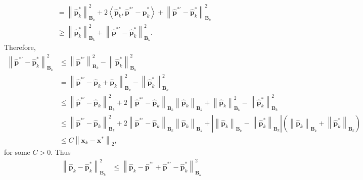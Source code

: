 \documentclass[aos]{imsart}
\numberwithin{equation}{section}
\theoremstyle{plain}
\begin{document}
\begin{appendix}
\begin{equation*}
\begin{split}
            & =  \left\|  \hat{\bm{p}}_{k}^{*}  \right\|_{\bm{B}_{k}}^2 + 2 \left\langle  \hat{\bm{p}}_{k}^{*}, \hat{\bm{p}}^{* \prime} -  \hat{\bm{p}}_{k}^{*} \right \rangle + \left\|   \hat{\bm{p}}^{* \prime} - \hat{\bm{p}}_{k}^{*} \right\|_{\bm{B}_{k}}^2 \\
            & \geq  \left\|  \hat{\bm{p}}_{k}^{*}  \right\|_{\bm{B}_{k}}^2 + \left\|   \hat{\bm{p}}^{* \prime} - \hat{\bm{p}}_{k}^{*} \right\|_{\bm{B}_{k}}^2. 
        \end{split}
    \end{equation*}
    Therefore, 
    \begin{equation*}
       \begin{split}
            \left\| \hat{\bm{p}}^{* \prime} - \hat{\bm{p}}_{k}^{*} \right\|_{\bm{B}_{k}}^2 & \leq \left\| \hat{\bm{p}}^{* \prime} \right\|_{\bm{B}_{k}}^2  - \left\|  \hat{\bm{p}}_{k}^{*}  \right\|_{\bm{B}_{k}}^2 \\
            & = \left\| \hat{\bm{p}}^{* \prime} - \hat{\bm{p}}_{k} + \hat{\bm{p}}_{k} \right\|_{\bm{B}_{k}}^2  - \left\|  \hat{\bm{p}}_{k}^{*}  \right\|_{\bm{B}_{k}}^2 \\
            & \leq \left\| \hat{\bm{p}}^{* \prime} - \hat{\bm{p}}_{k}  \right\|_{\bm{B}_{k}}^2 + 2 \left\| \hat{\bm{p}}^{* \prime} - \hat{\bm{p}}_{k}  \right\|_{\bm{B}_{k}} \left\| \hat{\bm{p}}_{k}  \right\|_{\bm{B}_{k}} + \left\| \hat{\bm{p}}_{k}  \right\|_{\bm{B}_{k}}^2 - \left\|  \hat{\bm{p}}_{k}^{*}  \right\|_{\bm{B}_{k}}^2 \\ 
            & \leq \left\| \hat{\bm{p}}^{* \prime} - \hat{\bm{p}}_{k}  \right\|_{\bm{B}_{k}}^2 + 2 \left\| \hat{\bm{p}}^{* \prime} - \hat{\bm{p}}_{k}  \right\|_{\bm{B}_{k}} \left\| \hat{\bm{p}}_{k}  \right\|_{\bm{B}_{k}} + \left|\left\| \hat{\bm{p}}_{k}  \right\|_{\bm{B}_{k}} - \left\|  \hat{\bm{p}}_{k}^{*}  \right\|_{\bm{B}_{k}} \right| \left( \left\| \hat{\bm{p}}_{k}  \right\|_{\bm{B}_{k}} + \left\|  \hat{\bm{p}}_{k}^{*}  \right\|_{\bm{B}_{k}} \right) \\
            & \leq C \left\| \bm{x}_{k} - \bm{x}^{*} \right\|_2,
       \end{split} 
    \end{equation*}
    for some $C > 0$. Thus
    \begin{equation}
        \begin{split}
            \left\| \hat{\bm{p}}_{k} - \hat{\bm{p}}_{k}^{*} \right\|_{\bm{B}_{k}}^2 & \leq \left\| \hat{\bm{p}}_{k} -\hat{\bm{p}}^{* \prime} + \hat{\bm{p}}^{* \prime} - \hat{\bm{p}}_{k}^{*} \right\|_{\bm{B}_{k}}^2 \\

\end{split}
\end{equation}
\end{appendix}
\end{document}
